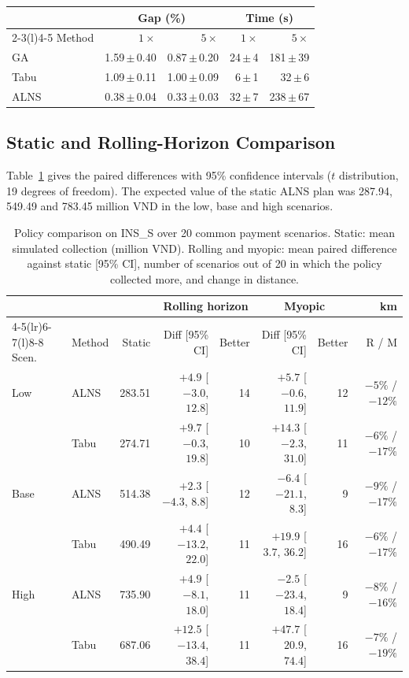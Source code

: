 \documentclass[11pt,a4paper]{article}
\begin{document}
\begin{table}[htbp]
\begin{minipage}[t]{0.415\linewidth}
\begin{tabular}{@{}lrrrr@{}}
\toprule
 & \multicolumn{2}{c}{Gap (\%)} & \multicolumn{2}{c}{Time (s)} \\
\cmidrule(lr){2-3}\cmidrule(l){4-5}
Method & $1\times$ & $5\times$ & $1\times$ & $5\times$ \\
\midrule
GA & 1.59\,$\pm$\,0.40 & 0.87\,$\pm$\,0.20 & 24\,$\pm$\,4 & 181\,$\pm$\,39 \\
Tabu & 1.09\,$\pm$\,0.11 & 1.00\,$\pm$\,0.09 & 6\,$\pm$\,1 & 32\,$\pm$\,6 \\
ALNS & 0.38\,$\pm$\,0.04 & 0.33\,$\pm$\,0.03 & 32\,$\pm$\,7 & 238\,$\pm$\,67 \\
\bottomrule
\end{tabular}
\end{minipage}
\end{table}

\subsection{Static and Rolling-Horizon Comparison}
Table~\ref{tab:paired} gives the paired differences with 95\% confidence
intervals ($t$ distribution, 19 degrees of freedom). The expected value of
the static ALNS plan was 287.94, 549.49 and 783.45 million VND in the low,
base and high scenarios.

\begin{table}[htbp]
\centering
\caption{Policy comparison on INS\_S over 20 common payment scenarios.
Static: mean simulated collection (million VND). Rolling and myopic: mean
paired difference against static [95\% CI], number of scenarios out of 20
in which the policy collected more, and change in distance.}
\label{tab:paired}
\scriptsize
\setlength{\tabcolsep}{3pt}
\begin{tabular}{@{}llrrrrrr@{}}
\toprule
& & & \multicolumn{2}{c}{Rolling horizon} & \multicolumn{2}{c}{Myopic} & km \\
\cmidrule(lr){4-5}\cmidrule(lr){6-7}\cmidrule(l){8-8}
Scen. & Method & Static & Diff [95\% CI] & Better & Diff [95\% CI] & Better & R / M \\
\midrule
Low  & ALNS & 283.51 & $+4.9$ [$-3.0$, $12.8$] & 14 & $+5.7$ [$-0.6$, $11.9$] & 12 & $-5\%$ / $-12\%$ \\
     & Tabu & 274.71 & $+9.7$ [$-0.3$, $19.8$] & 10 & $+14.3$ [$-2.3$, $31.0$] & 11 & $-6\%$ / $-17\%$ \\
\midrule
Base & ALNS & 514.38 & $+2.3$ [$-4.3$, $8.8$] & 12 & $-6.4$ [$-21.1$, $8.3$] & 9 & $-9\%$ / $-17\%$ \\
     & Tabu & 490.49 & $+4.4$ [$-13.2$, $22.0$] & 11 & $\mathbf{+19.9}$ [$3.7$, $36.2$] & 16 & $-6\%$ / $-17\%$ \\
\midrule
High & ALNS & 735.90 & $+4.9$ [$-8.1$, $18.0$] & 11 & $-2.5$ [$-23.4$, $18.4$] & 9 & $-8\%$ / $-16\%$ \\
     & Tabu & 687.06 & $+12.5$ [$-13.4$, $38.4$] & 11 & $\mathbf{+47.7}$ [$20.9$, $74.4$] & 16 & $-7\%$ / $-19\%$ \\
\bottomrule
\end{tabular}
\end{table}
\end{document}
